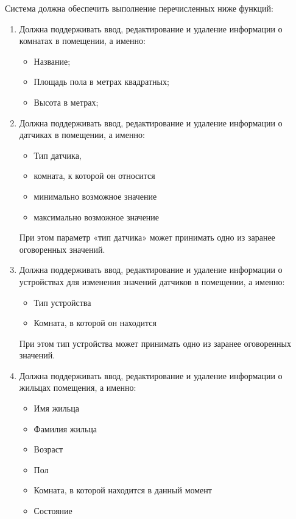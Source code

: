       Система должна обеспечить выполнение перечисленных ниже функций:
      \begin{enumerate}
        \item Должна поддерживать ввод, редактирование и удаление информации о комнатах в помещении, а именно:
          \begin{itemize}
            \item Название;
            \item Площадь пола в метрах квадратных;
            \item Высота в метрах;
          \end{itemize}
        \item Должна поддерживать ввод, редактирование и удаление информации о датчиках в помещении, а именно:
          \begin{itemize}
            \item Тип датчика,
            \item комната, к которой он относится
            \item минимально возможное значение
            \item максимально возможное значение
          \end{itemize}
          При этом параметр «тип датчика» может принимать одно из заранее оговоренных значений.
        \item Должна поддерживать ввод, редактирование и удаление информации о устройствах для изменения значений датчиков в помещении, а именно:
          \begin{itemize}
            \item Тип устройства
            \item Комната, в которой он находится
          \end{itemize}
          При этом тип устройства может принимать одно из заранее оговоренных значений.
        \item Должна поддерживать ввод, редактирование и удаление информации о жильцах помещения, а именно:
          \begin{itemize}
            \item Имя жильца 
            \item Фамилия жильца
            \item Возраст
            \item Пол
            \item Комната, в которой находится в данный момент
            \item Состояние
          \end{itemize}

\end{enumerate}

